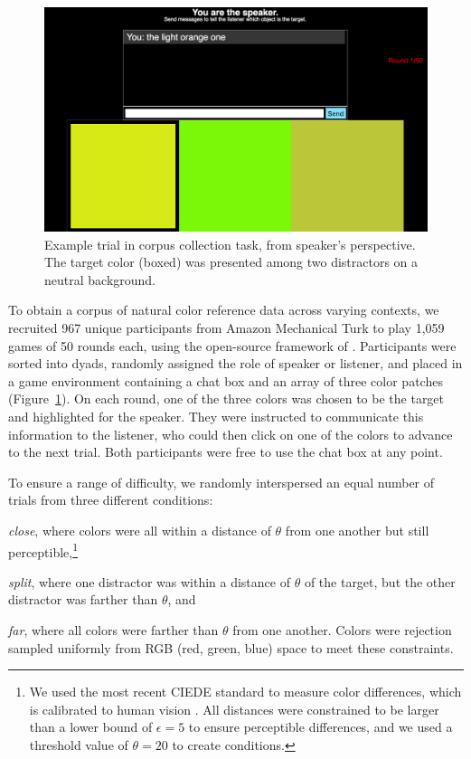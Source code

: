 \documentclass[11pt,letterpaper]{article}
\renewcommand{\|}{\mid}
\newcommand{\figref}[1]{Figure~\ref{#1}}
\newcommand{\cond}{\emph}
\begin{document}
\begin{figure}
\includegraphics[scale = .2]{figures/speakerView.png}
\caption{Example trial in corpus collection task, from speaker's
  perspective. The target color (boxed) was presented among two distractors on a neutral background.}
\label{fig:taskScreenshot}
\end{figure}
To obtain a corpus of natural color reference data across varying
contexts, we recruited 967 unique participants from Amazon
Mechanical Turk to play 1,059 games of 50 rounds each, using the open-source framework of
.
Participants were sorted into dyads, randomly assigned the role of speaker or listener,
and placed in a game environment containing a chat box and an array of three color patches
(\figref{fig:taskScreenshot}).
On each round, one of the three colors was chosen to be the target and
highlighted for the speaker. They were instructed to communicate this
information to the listener, who could then click on one of the colors
to advance to the next trial. Both participants were free to use the
chat box at any point.


To ensure a range of difficulty, we randomly interspersed an equal
number of trials from three different conditions:
%
\begin{enumerate*}[label=\arabic*)]%
\item \cond{close}, where colors were all within a distance of
  $\theta$ from one another but still perceptible,\footnote{We used the
    most recent CIEDE standard to measure color differences, which is
    calibrated to human vision \cite{SharmaWuDalal05_DeltaE}. All
    distances were constrained to be larger than a lower bound of
    $\epsilon = 5$ to ensure perceptible differences, and we used a
    threshold value of $\theta = 20$ to create conditions.}
\item \cond{split}, where one distractor was within a distance of
  $\theta$ of the target, but the other distractor was farther than
  $\theta$, and
\item \cond{far}, where all colors were farther than $\theta$ from one
  another. Colors were rejection sampled uniformly from RGB (red,
  green, blue) space to meet these constraints.
\end{enumerate*}
\end{document}
